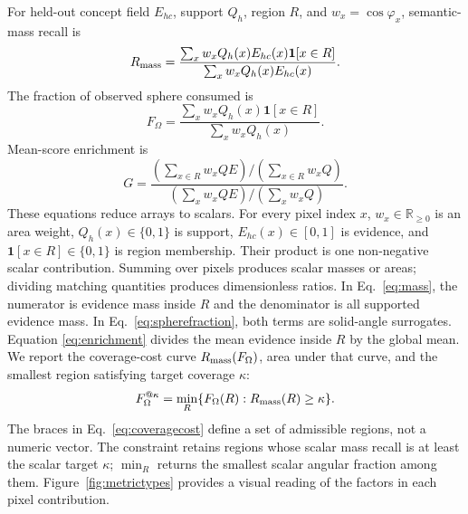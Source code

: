 \documentclass[a4paper,9pt]{extarticle}
\newcommand{\R}{\mathbb R}
\begin{document}
For held-out concept field $E_{hc}$, support $Q_h$, region $R$, and
$w_x=\cos\varphi_x$, semantic-mass recall is
\begin{equation}
 R_{\rm mass}=
 \frac{\sum_x w_x Q_h(x)E_{hc}(x)\mathbf1[x\in R]}
 {\sum_x w_x Q_h(x)E_{hc}(x)}.
 \label{eq:mass}
\end{equation}
The fraction of observed sphere consumed is
\begin{equation}
 F_\Omega=
 \frac{\sum_x w_xQ_h(x)\mathbf1[x\in R]}
 {\sum_x w_xQ_h(x)}.
 \label{eq:spherefraction}
\end{equation}
Mean-score enrichment is
\begin{equation}
 G=
 \frac{
 (\sum_{x\in R}w_xQE)/(\sum_{x\in R}w_xQ)}
 {(\sum_xw_xQE)/(\sum_xw_xQ)}.
 \label{eq:enrichment}
\end{equation}
These equations reduce arrays to scalars. For every pixel index $x$,
$w_x\in\R_{\ge0}$ is an area weight, $Q_h(x)\in\{0,1\}$ is support,
$E_{hc}(x)\in[0,1]$ is evidence, and $\mathbf1[x\in R]\in\{0,1\}$ is region
membership. Their product is one non-negative scalar contribution. Summing over
pixels produces scalar masses or areas; dividing matching quantities produces
dimensionless ratios. In Eq.~\ref{eq:mass}, the numerator is evidence mass
inside $R$ and the denominator is all supported evidence mass. In
Eq.~\ref{eq:spherefraction}, both terms are solid-angle surrogates. Equation
\ref{eq:enrichment} divides the mean evidence inside $R$ by the global mean.
We report the coverage-cost curve
$R_{\rm mass}(F_\Omega)$, area under that curve, and the smallest region satisfying target coverage $\kappa$:
\begin{equation}
 F_\Omega^{@\kappa}=
 \min_R\{F_\Omega(R):R_{\rm mass}(R)\ge\kappa\}.
 \label{eq:coveragecost}
\end{equation}
The braces in Eq.~\ref{eq:coveragecost} define a set of admissible regions, not
a numeric vector. The constraint retains regions whose scalar mass recall is at
least the scalar target $\kappa$; $\min_R$ returns the smallest scalar angular
fraction among them. Figure~\ref{fig:metrictypes} provides a visual reading of
the factors in each pixel contribution.
\end{document}
